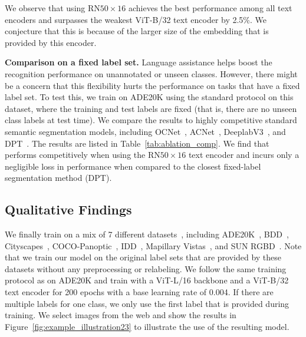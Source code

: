 We observe that using RN$50\times16$ achieves the best performance among all text encoders and surpasses the weakest ViT-B/32 text encoder by 2.5\%. We conjecture that this is because of the larger size of the embedding that is provided by this encoder.


\textbf{Comparison on a fixed label set.}
Language assistance helps boost the recognition performance on unannotated or unseen classes. However, there might be a concern that this flexibility hurts the performance on tasks that have a fixed label set. To test this, we train \methodname{} on ADE20K using the standard protocol on this dataset, where the training and test labels are fixed (that is, there are no unseen class labels at test time). We compare the results to highly competitive standard semantic segmentation models, including OCNet~\citep{yuan2020object}, ACNet~\citep{fu2019adaptive}, DeeplabV3~\citep{chen2017rethinking,zhang2020resnest}, and DPT~\citep{ranftl2021vision}. The results are listed in Table~\ref{tab:ablation_comp}. We find that \methodname{} performs competitively when using the RN$50\times16$ text encoder and incurs only a negligible loss in performance when compared to the closest fixed-label segmentation method (DPT).

\begin{table}[htb!]
    \centering
    
    \label{tab:ablation_comp}
\end{table}


\subsection{Qualitative Findings}
\label{sec:dis_qua}
We finally train \methodname{} on a mix of 7 different datasets~\citep{lambert2020mseg}, including ADE20K~\citep{zhou2019semantic}, BDD~\citep{yu2020bdd100k}, Cityscapes~\citep{Cordts2016Cityscapes}, COCO-Panoptic~\citep{lin2014microsoft,caesar2018coco},  IDD~\citep{varma2019idd}, Mapillary Vistas~\citep{neuhold2017mapillary}, and SUN RGBD~\citep{song2015sun}. Note that we train our model on the original label sets that are provided by these datasets  without any preprocessing or relabeling.
We follow the same training protocol as on ADE20K and train \methodname{} with a ViT-L/16 backbone and a ViT-B/32 text encoder 
for 200 epochs with a base learning rate of 0.004. If there are multiple labels for one class, we only use the first label that is provided during training. We select images from the web and show the results in Figure~\ref{fig:example_illustration23} to illustrate the use of the resulting model.



